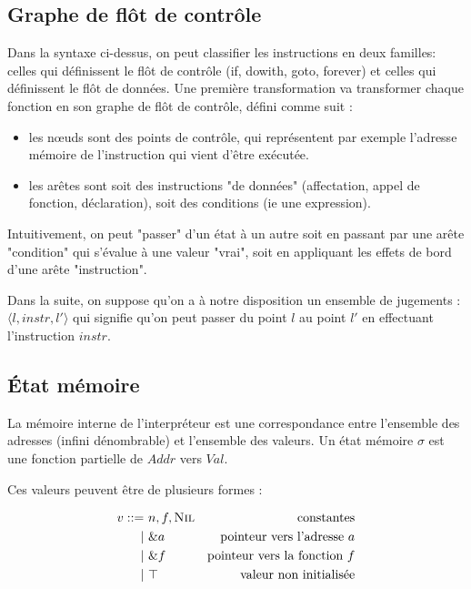\documentclass{article}
\newcommand{\cNil}{\textsc{Nil}}
\begin{document}
\subsection{Graphe de flôt de contrôle}

Dans la syntaxe ci-dessus, on peut classifier les instructions en deux familles:
celles qui définissent le flôt de contrôle (if, dowith, goto, forever) et celles
qui définissent le flôt de données. Une première transformation va transformer
chaque fonction en son graphe de flôt de contrôle, défini comme suit :

\begin{itemize}
\item
  les nœuds sont des points de contrôle, qui représentent par exemple
  l'adresse mémoire de l'instruction qui vient d'être exécutée.
\item
  les arêtes sont soit des instructions "de données" (affectation,
  appel de fonction, déclaration), soit des conditions (ie une
  expression).
\end{itemize}

Intuitivement, on peut "passer" d'un état à un autre soit en passant par une
arête "condition" qui s'évalue à une valeur "vrai", soit en appliquant les
effets de bord d'une arête "instruction".

Dans la suite, on suppose qu'on a à notre disposition un ensemble de jugements :
$\langle l, instr, l' \rangle$ qui signifie qu'on peut passer du point $l$ au
point $l'$ en effectuant l'instruction $instr$.

\subsection{État mémoire}

La mémoire interne de l'interpréteur est une correspondance entre l'ensemble des
adresses (infini dénombrable) et l'ensemble des valeurs. Un état mémoire $σ$ est
une fonction partielle de $Addr$ vers $Val$.

Ces valeurs peuvent être de plusieurs formes :

\begin{align*}
v   ::=~ & n, f, \cNil& \text{constantes}\\
      |~ & \&a        & \text{pointeur vers l'adresse $a$}\\
      |~ & \&f        & \text{pointeur vers la fonction $f$}\\
      |~ & \top       & \text{valeur non initialisée}
\end{align*}
\end{document}
